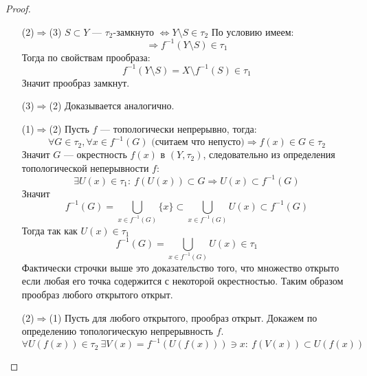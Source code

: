 \begin{proof}
	\hfill
	\begin{enumerate}
		\item[(2)$\Rightarrow$(3)] $S \subset Y$ --- $\tau_2$-замкнуто $\Leftrightarrow Y \setminus S \in \tau_2$ По условию имеем:
		$$\Rightarrow f^{-1}(Y\setminus S) \in \tau_1$$
		Тогда по свойствам прообраза:
		$$
		f^{-1}(Y\setminus S) = X\setminus f^{-1}(S) \in \tau_1
		$$
		Значит прообраз замкнут. 
		\item[(3)$\Rightarrow$(2)] Доказывается аналогично.
		\item [(1)$\Rightarrow$(2)] Пусть $f$ --- топологически непрерывно, тогда: 
		$$
		\forall G \in \tau_2, \forall x \in f^{-1}(G) \text{ (считаем что непусто)} \Rightarrow f(x) \in G \in \tau_2
		$$
		Значит $G$ --- окрестность $f(x)$ в $(Y, \tau_2)$, следовательно из определения топологической неперывности $f$:
		$$
		\exists U(x) \in \tau_1: \ f(U(x)) \subset G \Rightarrow U(x) \subset f^{-1}(G)
		$$
		Значит 
		$$
		f^{-1}(G)= \bigcup_{x \in f^{-1}(G)} \{x\} \subset \bigcup_{x \in f^{-1}(G)} U(x) \subset f^{-1}(G)
		$$
		Тогда так как $U(x) \in \tau_1$
		$$
		f^{-1}(G) = \bigcup_{x \in f^{-1}(G)} U(x) \in \tau_1
		$$
		Фактически строчки выше это доказательство того, что множество открыто если любая его точка содержится с некоторой окрестностью. Таким образом прообраз любого открытого открыт. 
		\item[(2)$\Rightarrow$(1)] Пусть для любого открытого, прообраз открыт. Докажем по определению топологическую непрерывность $f$. 
		$$
		\forall U(f(x)) \in \tau_2 \ \exists V(x) = f^{-1}(U(f(x))) \ni x: \ f(V(x)) \subset U(f(x))
		$$
	\end{enumerate}
\end{proof}

